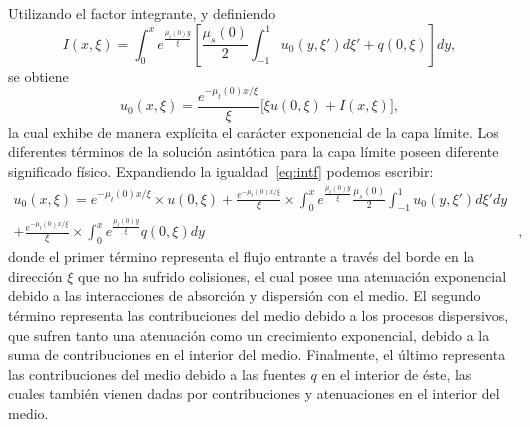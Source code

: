 Utilizando el factor integrante, y definiendo
\begin{equation*}
I(x,\xi) = \int_0^{x} e^{\frac{ \mu_t(0) y}{\xi}}\left[\frac{\mu_s(0)}{2} \int_{-1}^1u_0(y,\xi')d\xi'+q(0,\xi)\right]dy,
\end{equation*}
se obtiene
\begin{equation}
 u_0(x,\xi) = \frac{e^{-\mu_t(0)x/\xi}}{\xi} \Big[\xi u(0,\xi)+I(x,\xi)\Big] ,
 \label{eq:intf}
\end{equation}
la cual exhibe de manera explícita el carácter exponencial 
de la capa límite. Los diferentes términos de la solución asintótica 
para la capa límite poseen diferente significado físico. Expandiendo 
la igualdad~\eqref{eq:intf} podemos escribir:
\begin{equation}
\begin{aligned}
 u_0(x,\xi) =   e^{-\mu_t(0)x/\xi}\times u(0,\xi) + \frac{e^{-\mu_t(0)x/\xi}}{\xi} \times  \int_0^{x} e^{\frac{ \mu_t(0) y}{\xi}} \frac{\mu_s(0)}{2} \int_{-1}^1u_0(y,\xi')d\xi'dy&\\
 + \frac{e^{-\mu_t(0)x/\xi}}{\xi} \times \int_0^{x} e^{\frac{ \mu_t(0) y}{\xi}}  q(0,\xi) dy&,
 \label{eq:intfexpandida}
\end{aligned}
\end{equation}
donde el primer término representa el flujo entrante a través del borde en la dirección $\xi$ 
que no ha sufrido colisiones, el cual posee una atenuación exponencial 
debido a las interacciones de absorción y dispersión con el medio. El segundo término representa las contribuciones 
del medio debido a los procesos dispersivos, que sufren tanto una atenuación 
como un crecimiento exponencial, debido a la suma de contribuciones en el interior del medio. Finalmente, el último representa 
las contribuciones del medio debido a las fuentes $q$ en el interior de éste, 
las cuales también vienen dadas por contribuciones y atenuaciones en el interior del medio.

